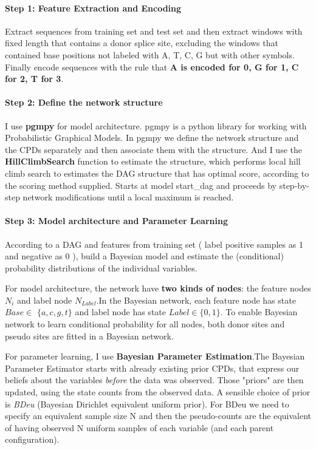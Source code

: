 \documentclass{gapd}
\begin{document}
\paragraph{Step 1: Feature Extraction and
Encoding}\label{feature-extraction-and-encoding}

Extract sequences from training set and test set and then extract
windows with fixed length that contains a donor splice site, excluding
the windows that contained base positions not labeled with A, T, C, G but
with other symbols. Finally encode sequences with the rule that
\textbf{A is encoded for 0, G for 1, C for 2, T for 3}.

\paragraph{Step 2: Define the network
structure}\label{define-the-network-structure}

I use \textbf{pgmpy} for model architecture. pgmpy is a python library
for working with Probabilistic Graphical Models. In pgmpy we define the
network structure and the CPDs separately and then associate them with
the structure. And I use the \textbf{HillClimbSearch} function to
estimate the structure, which performs local hill climb search to
estimates the DAG structure that has optimal score, according to the
scoring method supplied. Starts at model start\_dag and proceeds by
step-by-step network modifications until a local maximum is reached.

\paragraph{Step 3: Model architecture and Parameter
Learning}\label{model-architecture-and-parameter-learning}

According to a DAG and features from training set ( label positive samples
as 1 and negative as 0 ), build a Bayesian model and estimate the
(conditional) probability distributions of the individual variables.

For model architecture, the network have \textbf{two kinds of nodes}:
the feature nodes \(N_i\) and label node \(N_{Label}\).In the Bayesian
network, each feature node has state \({Base} \in\) \(\{a, c, g, t\}\)
and label node has state \({Label} \in\{0,1\}\). To enable Bayesian
network to learn conditional probability for all nodes, both donor
sites and pseudo sites are fitted in a Bayesian network.

For parameter learning, I use \textbf{Bayesian Parameter Estimation}.The
Bayesian Parameter Estimator starts with already existing prior CPDs,
that express our beliefs about the variables \emph{before} the data was
observed. Those "priors" are then updated, using the state counts from
the observed data. A sensible choice of prior is \emph{BDeu} (Bayesian
Dirichlet equivalent uniform prior). For BDeu we need to specify an
equivalent sample size N and then the pseudo-counts are the equivalent
of having observed N uniform samples of each variable (and each parent
configuration).
\end{document}
